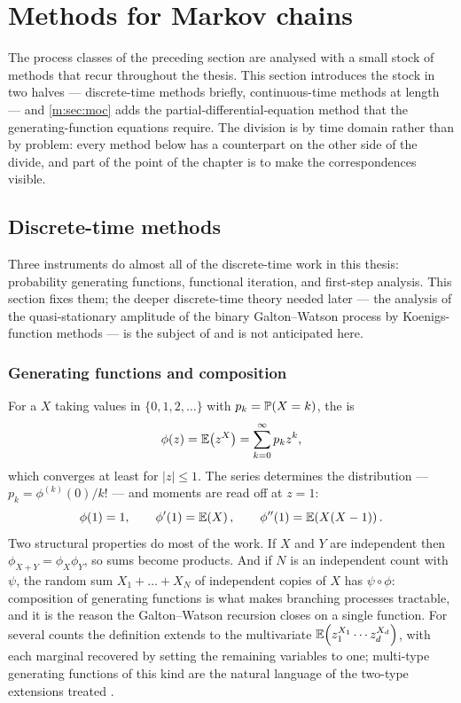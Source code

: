 \section{Methods for Markov chains}
\label{m:sec:methods}

The process classes of the preceding section are analysed with a small stock of
methods that recur throughout the thesis. This section introduces the stock in
two halves --- discrete-time methods briefly, continuous-time methods at length
--- and \cref{m:sec:moc} adds the partial-differential-equation method that the
generating-function equations require. The division is by time domain rather
than by problem: every method below has a counterpart on the other side of the
divide, and part of the point of the chapter is to make the correspondences
visible.

\subsection{Discrete-time methods}
\label{m:sec:methdisc}

Three instruments do almost all of the discrete-time work in this thesis:
probability generating functions, functional iteration, and first-step analysis.
This section fixes them; the deeper discrete-time theory needed later --- the
analysis of the quasi-stationary amplitude of the binary Galton--Watson process
by Koenigs-function methods --- is the subject of \ChA{} and is not anticipated
here.

\subsubsection{Generating functions and composition}
\label{m:sec:pgf}

For a \rv{} $X$ taking values in $\{0,1,2,\dots\}$ with $p_k=\mathbb{P}\!\left(X=k\right)$, the
\pgf{} is
\begin{equation}
\label{m:eq:pgfdef}
\phi(z) = \mathbb{E}\!\left(z^X\right) = \sum_{k=0}^{\infty}p_kz^k ,
\end{equation}
which converges at least for $|z|\le1$. The series determines the distribution
--- $p_k=\phi^{(k)}(0)/k!$ --- and moments are read off at $z=1$:
\begin{equation}
\label{m:eq:pgfmoments}
\phi(1)=1,\qquad \phi'(1)=\mathbb{E}\!\left(X\right),\qquad \phi''(1)=\mathbb{E}\!\left(X(X-1)\right) .
\end{equation}
Two structural properties do most of the work. If $X$ and $Y$ are independent
then $\phi_{X+Y}=\phi_X\phi_Y$, so sums become products. And if $N$ is an
independent count with \pgf{} $\psi$, the random sum $X_1+\dots+X_N$ of
independent copies of $X$ has \pgf{} $\psi\circ\phi$: composition of generating
functions is what makes branching processes tractable, and it is the reason the
Galton--Watson recursion closes on a single function. For several counts the
definition extends to the multivariate \pgf{}
$\mathbb{E}\!\left(z_1^{X_1}\cdots z_d^{X_d}\right)$, with each marginal recovered by setting the
remaining variables to one; multi-type generating functions of this kind are
the natural language of the two-type extensions treated .

